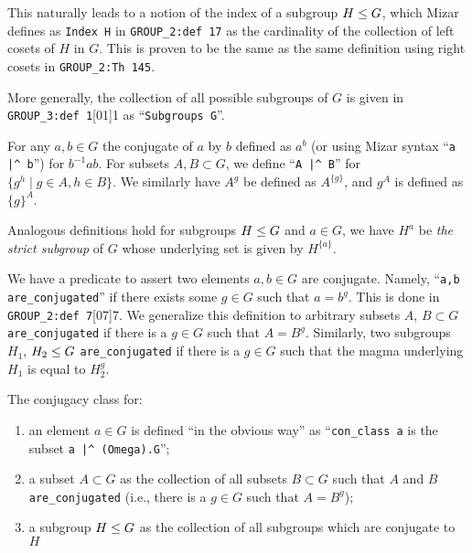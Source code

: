 This naturally leads to a notion of the index of a subgroup $H\leq G$,
which Mizar defines as \verb#Index H# in \verb#GROUP_2:def 17# as the
cardinality of the collection of left cosets of $H$ in $G$. This is
proven to be the same as the same definition using right cosets in
\verb#GROUP_2:Th 145#.

More generally, the collection of all possible subgroups of $G$ is given
in \verb#GROUP_3:def 1#[01]{1} as
``\verb#Subgroups G#''.

For any $a,b\in G$ the conjugate of $a$ by $b$ defined as $a^{b}$ (or
using Mizar syntax ``\verb#a |^ b#'')
for $b^{-1}ab$. For subsets $A,B\subset G$, we define
``\verb#A |^ B#'' for $\{g^{h}\mid g\in A,h\in B\}$. We similarly have
$A^{g}$ be defined as $A^{\{g\}}$, and $g^{A}$ is defined as $\{g\}^{A}$.

Analogous definitions hold for subgroups $H\leq G$ and $a\in G$, we
have $H^{a}$ be \emph{the strict subgroup} of $G$ whose underlying set
is given by $H^{\{a\}}$.

We have a predicate to assert two elements $a,b\in G$ are
conjugate. Namely, ``\verb#a,b are_conjugated#'' if there exists some
$g\in G$ such that $a = b^{g}$. This is done in
\verb#GROUP_2:def 7#[07]{7}. We generalize this
definition to arbitrary subsets $A$, $B\subset G$ \verb#are_conjugated# if
there is a $g\in G$ such that $A = B^{g}$. Similarly, two subgroups
$H_{1}$, $H_{2}\leq G$ \verb#are_conjugated# if there is a $g\in G$
such that the magma underlying $H_{1}$ is equal to $H_{2}^{g}$.

The conjugacy class for:
\begin{enumerate}
\item an element $a\in G$ is defined ``in the obvious way''
as ``\texttt{con\_class a}
is the subset \verb#a |^ (Omega).G#'';
\item a subset $A\subset G$ as the collection of all subsets $B\subset G$
such that $A$ and $B$ \verb#are_conjugated# (i.e., there is a $g\in G$
such that $A = B^{g}$);
\item a subgroup $H\leq G$ as the collection of all subgroups which
  are conjugate to $H$
\end{enumerate}

